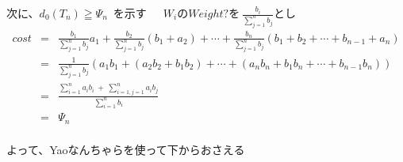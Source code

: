 \documentclass[11pt]{jarticle} %
\begin{document}
\newpage

次に、$d_0(T_n) \geqq \Psi_n$~を示す~~~$W_iのWeight?を~\displaystyle\frac{b_i}{\displaystyle\sum_{j=1}^{n} b_j}$とし\\
\begin{eqnarray*}
cost&=&\displaystyle\frac{b_1}{\displaystyle\sum_{j=1}^{n} b_j}a_1+\displaystyle\frac{b_2}{\displaystyle\sum_{j=1}^{n} b_j}(b_1+a_2)+\cdots+\displaystyle\frac{b_n}{\displaystyle\sum_{j=1}^{n} b_j}(b_1+b_2+\cdots+b_{n-1}+a_n)\\
&=&\displaystyle\frac{1}{\displaystyle\sum_{j=1}^{n} b_j}(a_1b_1+(a_2b_2+b_1b_2)+\cdots+(a_nb_n+b_1b_n+\cdots+b_{n-1}b_n))\\
&=&\displaystyle\frac{\displaystyle\sum_{i=1}^{n}a_ib_i~+~\displaystyle\sum_{i=1,j=1}^{n}a_ib_j}{\displaystyle\sum_{i=1}^{n} b_i}\\
&=&\Psi_n
\end{eqnarray*}\\
よって、Yaoなんちゃらを使って下からおさえる
\end{document}
